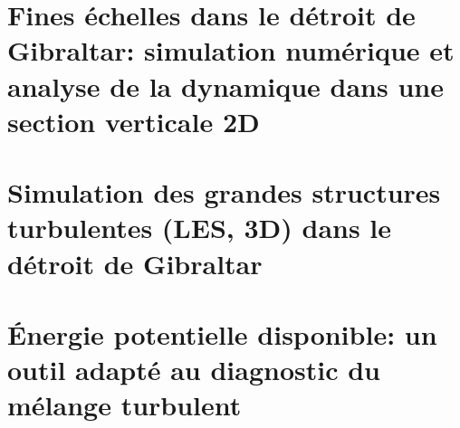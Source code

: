 \documentclass[a4paper,12pt,notitlepage,twoside]{report}
\numberwithin{equation}{section}
\begin{document}
\chapter[Fines échelles dans le détroit de Gibraltar: section verticale 2D]{Fines échelles dans le détroit de Gibraltar: simulation numérique et analyse de la dynamique dans une section verticale 2D}
\label{chapGBR2D}


%



\chapter{Simulation des grandes structures turbulentes (LES, 3D) dans le détroit de Gibraltar}
\label{chapGBR3D}
 





\chapter{Énergie potentielle disponible: un outil adapté au diagnostic du mélange turbulent}
\label{chapBPE}
\end{document}

